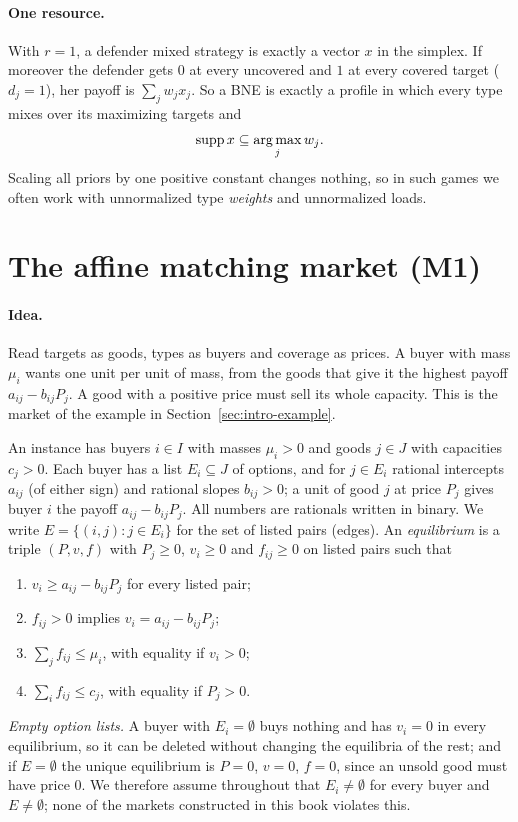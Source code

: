\paragraph{One resource.} With $r=1$, a defender mixed strategy is exactly a vector $x$ in the simplex.
If moreover the defender gets $0$ at every uncovered and $1$ at every covered target ($d_j=1$), her
payoff is $\sum_jw_jx_j$. So a BNE is exactly a profile in which every type mixes over its maximizing
targets and
\[
\operatorname{supp} x\subseteq\operatorname*{arg\,max}_jw_j .
\]
Scaling all priors by one positive constant changes nothing, so in such games we often work with
unnormalized type \emph{weights} and unnormalized loads.

\section{The affine matching market (M1)}\label{sec:pre-market}

\paragraph{Idea.} Read targets as goods, types as buyers and coverage as prices. A buyer with mass
$\mu_i$ wants one unit per unit of mass, from the goods that give it the highest payoff $a_{ij}-b_{ij}P_j$.
A good with a positive price must sell its whole capacity. This is the market of the example in
Section~\ref{sec:intro-example}.

\begin{definition}\label{def:m1}
An instance has buyers $i\in I$ with masses $\mu_i>0$ and goods $j\in J$ with capacities $c_j>0$.
Each buyer has a list $E_i\subseteq J$ of options, and for $j\in E_i$ rational intercepts $a_{ij}$ (of
either sign) and rational slopes $b_{ij}>0$; a unit of good $j$ at price $P_j$ gives buyer $i$ the
payoff $a_{ij}-b_{ij}P_j$. All numbers are rationals written in binary. We write
$E=\{(i,j):j\in E_i\}$ for the set of listed pairs (edges). An \emph{equilibrium} is a triple $(P,v,f)$
with $P_j\ge0$, $v_i\ge0$ and $f_{ij}\ge0$ on listed pairs such that
\begin{enumerate}[nosep,label=(\alph*)]
\item $v_i\ge a_{ij}-b_{ij}P_j$ for every listed pair;
\item $f_{ij}>0$ implies $v_i=a_{ij}-b_{ij}P_j$;
\item $\sum_jf_{ij}\le\mu_i$, with equality if $v_i>0$;
\item $\sum_if_{ij}\le c_j$, with equality if $P_j>0$.
\end{enumerate}

\emph{Empty option lists.} A buyer with $E_i=\emptyset$ buys nothing and has $v_i=0$ in every
equilibrium, so it can be deleted without changing the equilibria of the rest; and if $E=\emptyset$ the
unique equilibrium is $P=0$, $v=0$, $f=0$, since an unsold good must have price $0$. We therefore assume
throughout that $E_i\neq\emptyset$ for every buyer and $E\neq\emptyset$; none of the markets
constructed in this book violates this.
\end{definition}

